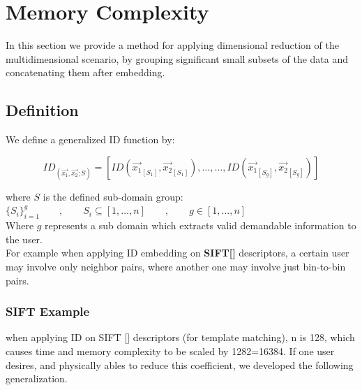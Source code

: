 
\chapter{Memory Complexity} %

\label{Chapter7}

In this section we provide a method for applying dimensional reduction of the multidimensional scenario, by grouping significant small subsets of the data and concatenating them after embedding. 


\section{Definition}

We define a generalized ID function by:

\begin{equation}
ID_(\overrightarrow{x_1} , \overrightarrow{x_2} ; S) = [ ID(\overrightarrow{x_1}_[S_1],\overrightarrow{x_2}_[S_1]) , \dots , \dots , ID(\overrightarrow{x_1}_[S_g],\overrightarrow{x_2}_[S_g])  ]
\end{equation}

where $S$ is the defined sub-domain group: \\ 

$\{S_i\}_{i=1}^g \qquad,\qquad S_i\subseteq [1, \dots , n] \qquad , \qquad g \in [1, \dots , n]$ \\ 

Where $g$ represents a sub domain which extracts valid demandable information to the user. \\ 

For example when applying ID embedding on \textbf{SIFT[]} descriptors, a certain user may involve only neighbor pairs, where another one may involve just bin-to-bin pairs.

\subsection{SIFT Example}

when applying ID on SIFT [] descriptors (for template matching),  n is 128, which causes time and memory complexity to be scaled by 1282=16384. 
If one user desires, and physically ables to reduce this coefficient, we developed the following generalization.

